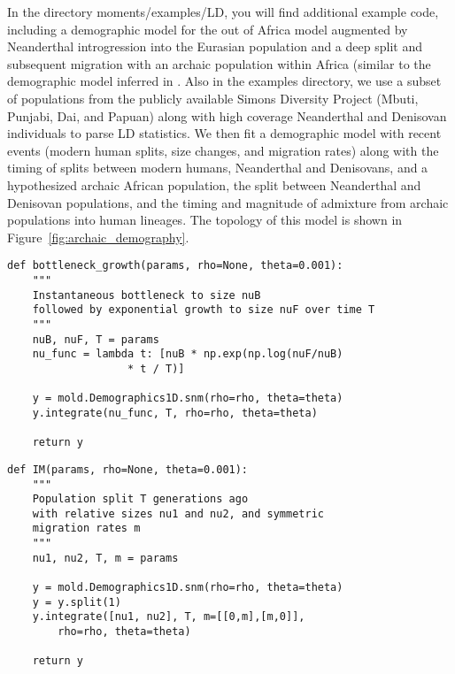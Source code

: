 \documentclass[10pt]{article}
\makeatletter
\renewcommand{\cite}{\citep}
\newcommand{\py}[1]{\lstinline[breaklines=true,language=Python, showstringspaces=False]@#1@}
\makeatother
\begin{document}
In the directory moments/examples/LD, you will find additional example code, including a demographic model for the out of Africa model augmented by Neanderthal introgression into the Eurasian population and a deep split and subsequent migration with an archaic population within Africa (similar to the demographic model inferred in \citet{Ragsdale2019}.
Also in the examples directory, we use a subset of populations from the publicly available Simons Diversity Project (Mbuti, Punjabi, Dai, and Papuan) \cite{Simons} along with high coverage Neanderthal and Denisovan individuals \cite{Pruefer} to parse LD statistics.
We then fit a demographic model with recent events (modern human splits, size changes, and migration rates) along with the timing of splits between modern humans, Neanderthal and Denisovans, and a hypothesized archaic African population, the split between Neanderthal and Denisovan populations, and the timing and magnitude of admixture from archaic populations into human lineages.
The topology of this model is shown in Figure~\ref{fig:archaic_demography}.

\clearpage

\begin{lstlisting}[caption={\textbf{Bottleneck model:} At time \py{T} in the past, an equilibrium population goes through a bottleneck of depth \py{nuB}, recovering to relative size \py{nuF} through exponential growth. In all examples listed here, we need to \py{import numpy as np} and \py{import moments.LD as mold}.}, float, label={lst:bottleneck}]
def bottleneck_growth(params, rho=None, theta=0.001):
    """
    Instantaneous bottleneck to size nuB
    followed by exponential growth to size nuF over time T
    """
    nuB, nuF, T = params
    nu_func = lambda t: [nuB * np.exp(np.log(nuF/nuB) 
    			   * t / T)]

    y = mold.Demographics1D.snm(rho=rho, theta=theta)
    y.integrate(nu_func, T, rho=rho, theta=theta)

    return y
\end{lstlisting}

\begin{lstlisting}[caption={\textbf{IM model:} One population splits into two some time in the past. Each population can have a new size, with symmetric and continuous migration between populations.}, float, label={lst:IM}]
def IM(params, rho=None, theta=0.001):
    """
    Population split T generations ago
    with relative sizes nu1 and nu2, and symmetric
    migration rates m
    """
    nu1, nu2, T, m = params
    
    y = mold.Demographics1D.snm(rho=rho, theta=theta)
    y = y.split(1)
    y.integrate([nu1, nu2], T, m=[[0,m],[m,0]],
        rho=rho, theta=theta)
    
    return y
\end{lstlisting}
\end{document}

